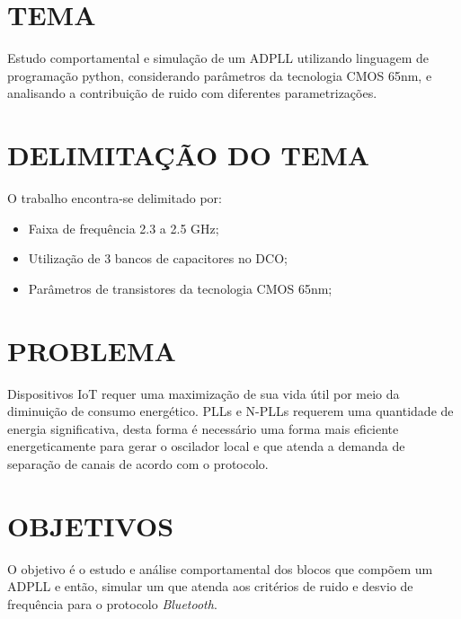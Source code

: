 \section{TEMA} 

Estudo comportamental e simulação de um ADPLL utilizando linguagem de programação python, considerando parâmetros da tecnologia CMOS 65nm, e analisando a contribuição de ruido com diferentes parametrizações. 

\section{DELIMITAÇÃO DO TEMA} 
O trabalho encontra-se delimitado por:

\begin{itemize}
	\item Faixa de frequência 2.3 a 2.5 GHz;
	\item Utilização de 3 bancos de capacitores no DCO;
	\item Parâmetros de transistores da tecnologia CMOS 65nm;
\end{itemize}

\section{PROBLEMA}
Dispositivos IoT requer uma maximização de sua vida útil por meio da diminuição de consumo energético. PLLs e N-PLLs requerem uma quantidade de energia significativa, desta forma é necessário uma forma mais eficiente energeticamente para gerar o oscilador local e que atenda a demanda de separação de canais de acordo com o protocolo.

\section{OBJETIVOS}
O objetivo é o estudo e análise comportamental dos blocos que compõem um ADPLL e então, simular um que atenda aos critérios de ruido e desvio de frequência para o protocolo \textit{Bluetooth}.
